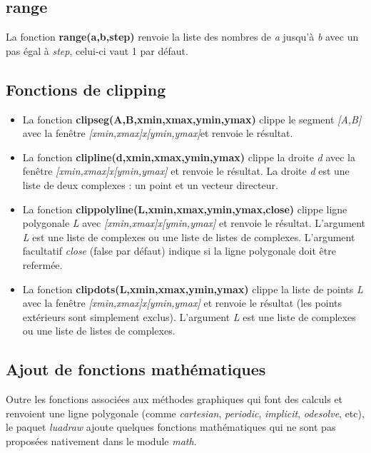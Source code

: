 \subsection{range}
La fonction \textbf{range(a,b,step)} renvoie la liste des nombres de \emph{a} jusqu'à \emph{b} avec un pas égal à \emph{step}, celui-ci vaut 1 par défaut.

\subsection{Fonctions de clipping}

\begin{itemize}
    \item La fonction \textbf{clipseg(A,B,xmin,xmax,ymin,ymax)} clippe le segment \emph{{[}A,B{]}} avec la fenêtre \emph{{[}xmin,xmax{]}x{[}ymin,ymax{]}}et renvoie le résultat.
    \item La fonction \textbf{clipline(d,xmin,xmax,ymin,ymax)} clippe la droite \emph{d} avec la fenêtre \emph{{[}xmin,xmax{]}x{[}ymin,ymax{]}} et renvoie le résultat. La droite \emph{d} est une liste de deux complexes : un point et un vecteur directeur.
    \item La fonction \textbf{clippolyline(L,xmin,xmax,ymin,ymax,close)} clippe ligne polygonale \emph{L} avec \emph{{[}xmin,xmax{]}x{[}ymin,ymax{]}} et renvoie le résultat. L'argument \emph{L} est une liste de complexes ou une liste de listes de complexes. L'argument facultatif \emph{close} (false par défaut) indique si la ligne polygonale doit être refermée.
    \item La fonction \textbf{clipdots(L,xmin,xmax,ymin,ymax)} clippe la liste de points \emph{L} avec la fenêtre \emph{{[}xmin,xmax{]}x{[}ymin,ymax{]}} et renvoie le résultat (les points extérieurs sont simplement exclus). L'argument \emph{L} est une liste de complexes ou une liste de listes de complexes.
\end{itemize}

\subsection{Ajout de fonctions mathématiques}
Outre les fonctions associées aux méthodes graphiques qui font des calculs et renvoient une ligne polygonale (comme \emph{cartesian}, \emph{periodic}, \emph{implicit}, \emph{odesolve}, etc), le paquet \emph{luadraw} ajoute quelques fonctions mathématiques qui ne sont pas proposées nativement dans le module \emph{math}.

